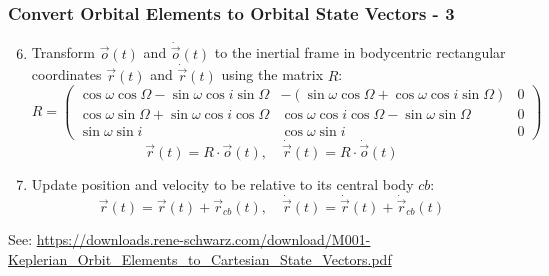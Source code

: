 \begin{frame}
    \frametitle{Convert Orbital Elements to Orbital State Vectors - 3}
    \btVFill
    \begin{enumerate}
        \setcounter{enumi}{5}
        \item Transform $\vec{o}(t)$ and $\dot{\vec{o}}(t)$ to the inertial frame in bodycentric rectangular coordinates $\vec{r}(t)$ and $\dot{\vec{r}}(t)$ using the matrix $R$:
        $$R = \begin{pmatrix} 
                \cos{\omega}\cos{\Omega} - \sin{\omega}\cos{i}\sin{\Omega} & -(\sin{\omega}\cos{\Omega} + \cos{\omega}\cos{i}\sin{\Omega}) & 0 \\ 
                \cos{\omega}\sin{\Omega} + \sin{\omega}\cos{i}\cos{\Omega} & \cos{\omega}\cos{i}\cos{\Omega} - \sin{\omega}\sin{\Omega} & 0 \\ 
                \sin{\omega}\sin{i} & \cos{\omega}\sin{i} & 0
              \end{pmatrix}$$
        $$ \vec{r}(t) = R \cdot \vec{o}(t), \quad 
           \dot{\vec{r}}(t) = R \cdot \dot{\vec{o}}(t)$$
        \item Update position and velocity to be relative to its central body $cb$:
        $$ \vec{r}(t) = \vec{r}(t) + \vec{r}_{cb}(t), \quad
           \dot{\vec{r}}(t) = \dot{\vec{r}}(t) + \dot{\vec{r}}_{cb}(t)$$
    \end{enumerate}
    \btVFill
    \setfontsize{8pt}
    See: \url{https://downloads.rene-schwarz.com/download/M001-Keplerian_Orbit_Elements_to_Cartesian_State_Vectors.pdf}
\end{frame}
